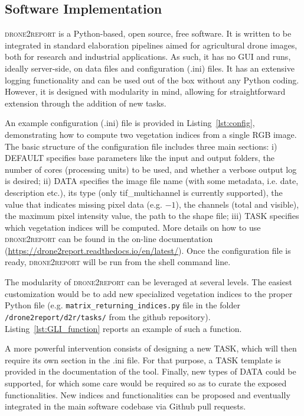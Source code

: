 \documentclass[drones,technicalnote,accept,pdftex,moreauthors]{Definitions/mdpi}
\begin{document}
\subsection{Software Implementation}

\textsc{drone2report} is a Python-based, open source, free software. It is written to be integrated in standard elaboration pipelines aimed for agricultural drone images, both for research and industrial applications. As such, it has no GUI and runs, ideally server-side, on data files and configuration (.ini) files. It has an extensive logging functionality and can be used out of the box without any Python coding. However, it is designed with modularity in mind, allowing for straightforward extension through the addition of new tasks.

An example configuration (.ini) file is provided in Listing~\ref{lst:config}, demonstrating how to compute two vegetation indices from a single RGB image.
The basic structure of the configuration file includes three main sections: i) DEFAULT specifies base parameters like the input and output folders, the number of cores (processing units) to be used, and whether a verbose output log is desired; ii) DATA specifies the image file name (with some metadata, i.e. date, description etc.), its type (only tif\_multichannel is currently supported), the value that indicates missing pixel data (e.g. $-1$), the channels (total and visible), the maximum pixel intensity value, the path to the shape file; iii) TASK specifies which vegetation indices will be computed. 
More details on how to use \textsc{drone2report} can be found in the on-line documentation (\url{https://drone2report.readthedocs.io/en/latest/}).
Once the configuration file is ready, \textsc{drone2report} will be run from the shell command line.

The modularity of \textsc{drone2report} can be leveraged at several levels. The easiest customization would be to add new specialized vegetation indices to the proper Python file (e.g. \verb|matrix_returning_indices.py| file in the folder \verb|/drone2report/d2r/tasks/| from the github repository). Listing~\ref{lst:GLI_function} reports an example of such a function.

A more powerful intervention consists of designing a new TASK, which will then require its own section in the .ini file. For that purpose, a TASK template is provided in the documentation of the tool. Finally, new types of DATA could be supported, for which some care would be required so as to curate the exposed functionalities.
New indices and functionalities can be proposed and eventually integrated in the main software codebase via Github pull requests.
\end{document}
